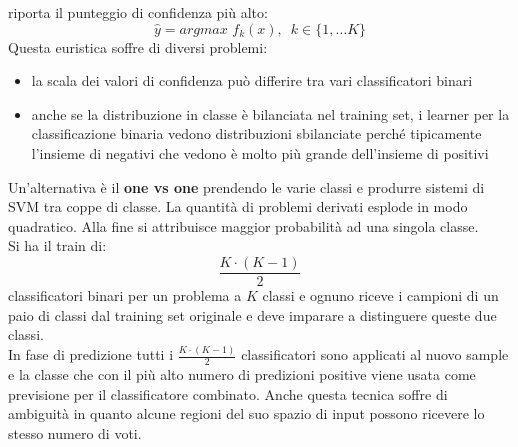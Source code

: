 riporta il punteggio di confidenza più alto:
\[\hat{y}=argmax\,\,f_k(x),\,\,\,k\in\{1,\ldots K\}\]
Questa euristica soffre di diversi problemi:
\begin{itemize}
  \item la scala dei valori di confidenza può differire tra vari classificatori
  binari 
  \item anche se la distribuzione in classe è bilanciata nel training set, i
  learner per la classificazione binaria vedono distribuzioni sbilanciate
  perché tipicamente l'insieme di negativi che vedono è molto più grande
  dell'insieme di positivi
\end{itemize}
Un'alternativa è il \textbf{one vs one} prendendo le varie classi e produrre
sistemi di SVM tra coppe di classe. La quantità di problemi derivati esplode in
modo quadratico. Alla fine si attribuisce maggior probabilità ad una singola
classe.\\
Si ha il train di:
\[\frac{K\cdot (K-1)}{2}\]
classificatori binari per un problema a $K$ classi e ognuno riceve i campioni di
un paio di classi dal training set originale e deve imparare a
distinguere queste due classi.\\
In fase di predizione tutti i $\frac{K\cdot (K-1)}{2}$ classificatori sono
applicati al nuovo sample e la classe che con il più alto numero di predizioni
positive viene usata come previsione per il classificatore combinato. Anche
questa tecnica soffre di ambiguità in quanto alcune regioni del suo spazio di
input possono ricevere lo stesso numero di voti.
